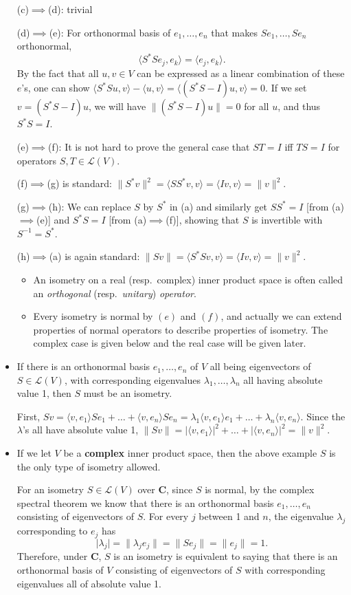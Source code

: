 \documentclass[11pt]{article}
\newcommand{\df}[1]{\textit{\textsf{#1}}}
\newcommand{\C}{\mathbf{C}}
\newcommand{\inp}[2]{\langle #1, #2 \rangle}
\newcommand{\nm}[1]{\lVert #1 \rVert}
\newcommand{\abs}[1]{\lvert #1 \rvert}
\newcommand{\LV}{\mathcal{L}(V)}
\begin{document}
\begin{itemize}
    (c)$\implies$(d): trivial
    
    (d)$\implies$(e): For orthonormal basis of $e_1,\dots,e_n$ that makes $Se_1,\dots,Se_n$ orthonormal, $$\inp{S^*Se_j}{e_k}=\inp{e_j}{e_k}.$$ By the fact that all $u,v \in V$ can be expressed as a linear combination of these $e$'s, one can show $\inp{S^*Su}{v}-\inp{u}{v} = \inp{(S^*S-I)u}{v} = 0$. If we set $v = (S^*S-I)u$, we will have $\nm{(S^*S-I)u}=0$ for all $u$, and thus $S^*S=I$.
    
    (e)$\implies$(f): It is not hard to prove the general case that $ST = I$ iff $TS =I$ for operators $S,T \in \LV$.
    
    (f)$\implies$(g) is standard: $\nm{S^*v}^2=\inp{SS^*v}{v} = \inp{Iv}{v} = \nm{v}^2$.
    
    (g)$\implies$(h): We can replace $S$ by $S^*$ in (a) and similarly get $SS^*=I$ [from (a)$\implies$(e)] and $S^*S=I$ [from (a)$\implies$(f)], showing that $S$ is invertible with $S^{-1}=S^*$.
    
    (h)$\implies$(a) is again standard: $\nm{Sv} = \inp{S^*Sv}{v} = \inp{Iv}{v} = \nm{v}^2$.
    \begin{itemize}
        \item An isometry on a real (resp.\ complex) inner product space is often called an \df{orthogonal} (resp.\ \df{unitary}) \df{operator}.
        \item Every isometry is normal by $(e)$ and $(f)$, and actually we can extend properties of normal operators to describe properties of isometry. The complex case is given below and the real case will be given later.
    \end{itemize}
    \item If there is an orthonormal basis $e_1,\dots,e_n$ of $V$ all being eigenvectors of $S \in \LV$, with corresponding eigenvalues $\lambda_1,\dots,\lambda_n$ all having absolute value 1, then $S$ must be an isometry.
    
    First, $Sv = \inp{v}{e_1}Se_1 + \dots + \inp{v}{e_n}Se_n = \lambda_1\inp{v}{e_1}e_1 + \dots + \lambda_n\inp{v}{e_n}$. Since the $\lambda$'s all have absolute value 1, $\nm{Sv} = \abs{\inp{v}{e_1}}^2 + \dots + \abs{\inp{v}{e_n}}^2 = \nm{v}^2$.
    \item If we let $V$ be a \textbf{complex} inner product space, then the above example $S$ is the only type of isometry allowed.
    
    For an isometry $S \in \LV$ over $\C$, since $S$ is normal, by the complex spectral theorem we know that there is an orthonormal basis $e_1,\dots,e_n$ consisting of eigenvectors of $S$. For every $j$ between 1 and $n$, the eigenvalue $\lambda_j$ corresponding to $e_j$ has \[\abs{\lambda_j}=\nm{\lambda_je_j}=\nm{Se_j}=\nm{e_j}=1.\]
    Therefore, under $\C$, $S$ is an isometry is equivalent to saying that there is an orthonormal basis of $V$ consisting of eigenvectors of $S$ with corresponding eigenvalues all of absolute value 1.
\end{itemize}
\end{document}
